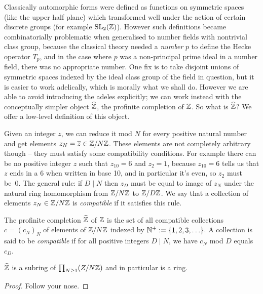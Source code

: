 Classically automorphic forms were defined as functions on symmetric spaces (like the upper half
plane) which transformed well under the action of certain discrete groups (for example $\operatorname{SL}_2(\mathbb{Z})$).
However such definitions became combinatorially problematic when generalised to number fields
with nontrivial class group, because the classical theory needed a \emph{number} $p$ to define
the Hecke operator $T_p$, and in the case where $p$ was a non-principal prime ideal in a number
field, there was no appropriate number. One fix is to take disjoint unions of symmetric spaces
indexed by the ideal class group of the field in question, but it is easier to work adelically,
which is morally what we shall do. However we are able to avoid introducing the adeles
explicitly; we can work instead with the conceptually simpler object $\widehat{\mathbb{Z}}$,
the profinite completion of $\mathbb{Z}$. So what is $\widehat{\mathbb{Z}}$? We offer a low-level definition of this object.

Given an integer $z$, we can reduce it mod $N$ for every positive natural
number and get elements $z_N=\overline{z}\in\mathbb{Z}/N\mathbb{Z}$. These elements are not completely arbitrary
though -- they must satisfy some compatibility conditions. For example there can be no
positive integer $z$ such that $z_{10}=6$ and $z_2=1$, because $z_{10}=6$ tells us that
$z$ ends in a 6 when written in base 10, and in particular it's even, so $z_2$ must be~0.
The general rule: if $D\mid N$ then $z_D$ must be equal to image of $z_N$ under the natural
ring homomorphism from $\mathbb{Z}/N\mathbb{Z}$ to $\mathbb{Z}/D\mathbb{Z}$. We say that a collection of elements
$z_N\in\mathbb{Z}/N\mathbb{Z}$ is \emph{compatible} if it satisfies this rule.

\begin{definition}\label{ZHat}\leanok The profinite completion $\widehat{\mathbb{Z}}$ of $\mathbb{Z}$ is the set of
    all compatible collections $c=(c_N)_N$ of elements of $\mathbb{Z}/N\mathbb{Z}$ indexed by $\mathbb{N}^+:=\{1,2,3,\ldots\}$.
    A collection is said to be \emph{compatible} if for all positive integers
    $D\mid N$, we have $c_N$ mod $D$ equals $c_D$.
\end{definition}

\begin{lemma}
    \label{ZHat.commRing}
    \leanok
    $\widehat{\mathbb{Z}}$ is a subring of $\prod_{N\geq1}(Z/N\mathbb{Z})$ and in particular is a ring.
\end{lemma}
\begin{proof} \leanok Follow your nose.
\end{proof}

